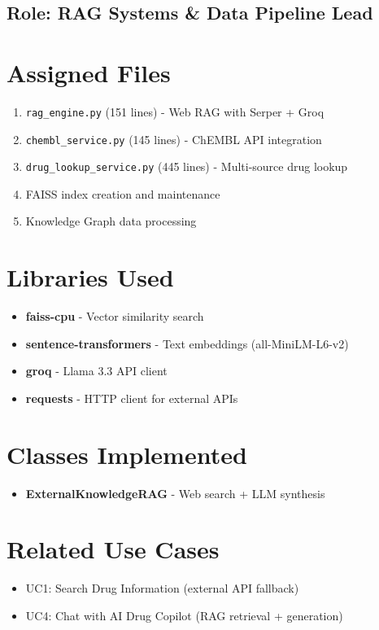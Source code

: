 \documentclass[12pt,a4paper]{report}
\begin{document}
\subsection*{Role: RAG Systems \& Data Pipeline Lead}

\section{Assigned Files}
\begin{enumerate}
    \item \texttt{rag\_engine.py} (151 lines) - Web RAG with Serper + Groq
    \item \texttt{chembl\_service.py} (145 lines) - ChEMBL API integration
    \item \texttt{drug\_lookup\_service.py} (445 lines) - Multi-source drug lookup
    \item FAISS index creation and maintenance
    \item Knowledge Graph data processing
\end{enumerate}

\section{Libraries Used}
\begin{itemize}
    \item \textbf{faiss-cpu} - Vector similarity search
    \item \textbf{sentence-transformers} - Text embeddings (all-MiniLM-L6-v2)
    \item \textbf{groq} - Llama 3.3 API client
    \item \textbf{requests} - HTTP client for external APIs
\end{itemize}

\section{Classes Implemented}
\begin{itemize}
    \item \textbf{ExternalKnowledgeRAG} - Web search + LLM synthesis
\end{itemize}

\section{Related Use Cases}
\begin{itemize}
    \item UC1: Search Drug Information (external API fallback)
    \item UC4: Chat with AI Drug Copilot (RAG retrieval + generation)
\end{itemize}
\end{document}
